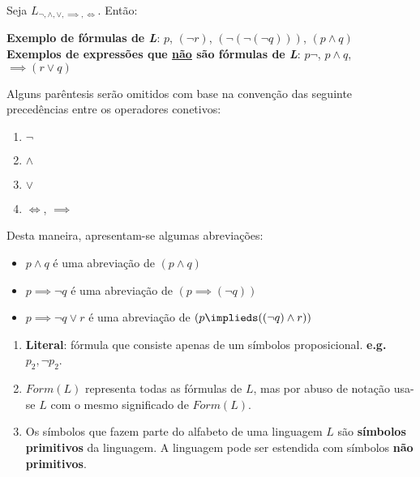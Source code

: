 \begin{example}
    Seja $L_{\neg,\land,\lor,\implies,\iff}$. Então:
\end{example}

\textbf{Exemplo de fórmulas de \textit{L}}: $p$, $(\neg r)$, $(\neg(\neg(\neg q)))$, $(p\land q)$\\

\textbf{Exemplos de expressões que \underline{não} são fórmulas de \textit{L}}: $p\neg$, $p\land q$, $\implies (r \lor q)$\\

\begin{definition}
    Alguns parêntesis serão omitidos com base na convenção das seguinte precedências entre os operadores conetivos:

    \begin{enumerate}
        \item $\neg$
        \item $\land$
        \item $\lor$
        \item $\iff$, $\implies$
    \end{enumerate}
\end{definition}

Desta maneira, apresentam-se algumas abreviações:

\begin{note}\end{note}
\begin{itemize}
    \item $p \land q$ é uma abreviação de $(p \land q)$
    \item $p \implies \neg q$ é uma abreviação de $(p\implies(\neg q))$
    \item $p\implies \neg q \lor r$ é uma abreviação de $(p\implieds((\neg q) \land r))$
\end{itemize}

\begin{enumerate}[label=\arabic*.]
    \item \textbf{Literal}: fórmula que consiste apenas de um símbolos proposicional. \textbf{e.g.} $p_2, \neg p_2$.
    \item $Form(L)$ representa todas as fórmulas de $L$, mas por abuso de notação usa-se $L$ com o mesmo significado de $Form(L)$.
    \item Os símbolos que fazem parte do alfabeto de uma linguagem $L$ são \textbf{símbolos primitivos} da linguagem. A linguagem pode ser estendida com símbolos \textbf{não primitivos}.
\end{enumerate}